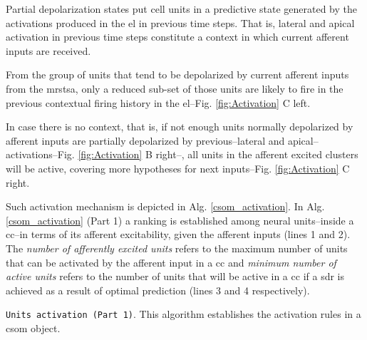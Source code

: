 {Partial depolarization states put cell units in a predictive state generated by
the activations produced in the \gls{el} in previous time steps.
That is, lateral and apical activation in previous time steps constitute a context in which
current afferent inputs are received.

From the group of units that tend to be depolarized by current afferent inputs from the \gls{mrstsa},
only a reduced sub-set of those units are likely to fire in the previous contextual firing history
in the \gls{el}--Fig. \ref{fig:Activation} C left.

In case there is no context, that is, if not enough units normally depolarized by afferent inputs
are partially depolarized by previous--lateral and apical--activations--Fig. \ref{fig:Activation} B right--,
all units in the afferent excited clusters will be active, covering more hypotheses for next inputs--Fig. \ref{fig:Activation} C right.

Such activation mechanism is depicted in Alg. \ref{csom_activation}. In Alg. \ref{csom_activation} (Part 1) a ranking is established among neural units--inside a \gls{cc}--in terms of its afferent excitability, given the afferent inputs (lines 1 and 2). The \emph{number of afferently excited units}  refers to the maximum number of  units that can be activated by the afferent input in a \gls{cc} and \emph{minimum number of active units} refers to the number of units that will be active in a \gls{cc} if a \gls{sdr} is achieved as a result of optimal prediction (lines 3 and 4 respectively).

\begin{algorithm}
	\caption{\texttt{Units activation (Part 1)}. This algorithm establishes the activation rules in a \gls{csom} object.}
\label{csom_activation}
\begin{algorithmic}[1]




	\ELSE
	\ENDIF


\end{algorithmic}
\end{algorithm}}
